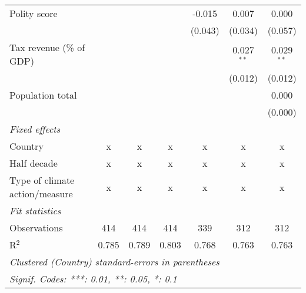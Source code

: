 \begin{tabular}{lcccccc}
   Polity score                                                     &         &              &                & -0.015         & 0.007          & 0.000\\   
                                                                    &         &              &                & (0.043)        & (0.034)        & (0.057)\\   
   Tax revenue (\% of GDP)                                          &         &              &                &                & 0.027$^{**}$   & 0.029$^{**}$\\   
                                                                    &         &              &                &                & (0.012)        & (0.012)\\   
   Population total                                                 &         &              &                &                &                & 0.000\\   
                                                                    &         &              &                &                &                & (0.000)\\   
   \emph{Fixed effects}\\
   Country                                                          & x       & x            & x              & x              & x              & x\\  
   Half decade                                                      & x       & x            & x              & x              & x              & x\\  
   Type of climate action/measure                                   & x       & x            & x              & x              & x              & x\\  
   \midrule \emph{Fit statistics}\\
   Observations                                                     & 414     & 414          & 414            & 339            & 312            & 312\\  
   R$^2$                                                            & 0.785   & 0.789        & 0.803          & 0.768          & 0.763          & 0.763\\  
   \midrule
   \multicolumn{7}{l}{\emph{Clustered (Country) standard-errors in parentheses}}\\
   \multicolumn{7}{l}{\emph{Signif. Codes: ***: 0.01, **: 0.05, *: 0.1}}\\
\end{tabular}
\par\endgroup


